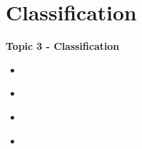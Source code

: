 \documentclass[fleqn]{beamer} %
\newcommand{\sectionIIItitle}{Classification}
\newcommand{\sectionIIIsubsectionItitle}{}
\newcommand{\sectionIIIsubsectionIItitle}{}
\newcommand{\sectionIIIsubsectionIIItitle}{}
\newcommand{\sectionIIIsubsectionIVtitle}{}
\begin{document}
	\section{\sectionIIItitle}\label{sectionIII}

		\begin{frame}
			\large \textbf{Topic 3 - \sectionIIItitle} \vspace{3mm}\\

			\begin{itemize}
				\item \hyperlink{sectionIIIsubsectionI}{\sectionIIIsubsectionItitle} \vspc %
				\item \hyperlink{sectionIIIsubsectionII}{\sectionIIIsubsectionIItitle} \vspc %
				\item \hyperlink{sectionIIIsubsectionIII}{\sectionIIIsubsectionIIItitle} \vspc %
				\item \hyperlink{sectionIIIsubsectionIV}{\sectionIIIsubsectionIVtitle} \vspc %
			\end{itemize}

		\end{frame}


		\subsection{\sectionIIIsubsectionItitle}\label{sectionIIIsubsectionI}

			\begin{frame}
				\frametitle{\sectionIIIsubsectionItitle}
				\bigskip

			  	
				\btVFill
			\end{frame}

			\begin{frame}
				\frametitle{\sectionIIIsubsectionItitle}
				\bigskip

			  
				\btVFill
			\end{frame}


		\subsection{\sectionIIIsubsectionIItitle}\label{sectionIIIsubsectionII}	

			\begin{frame}
				\frametitle{\sectionIIIsubsectionIItitle}
				\bigskip

				
				\btVFill
			\end{frame}
\end{document}
